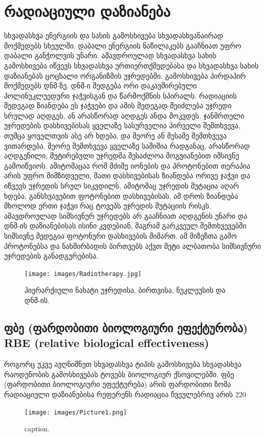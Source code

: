 \documentclass[12pt,a4paper,]{report}
\begin{document}
\chapter{რადიაციული დაზიანება}
სხვადასხვა ენერგიის და სახის გამოსხივება სხვადასხვანაირად მოქმედებს სხეულში. დაბალი ენერგიის ნაწილაკებს გააჩნიათ უფრო დაბალი განჭოლვის უნარი. ამავდროულად სხვადასხვა სახის გამოსხივება იწვევს სხვადასხვა ურთიერთქმედებასა და  სხვადასხვა სახის დაზიანებას ცოცხალი ორგანიზმის უჯრედებში. გამოსხივება პირდაპირ მოქმედებს დნმ-ზე. დნმ-ი შედგება ორი დაკავშირებული პოლინუკლუედური ჯაჭვისგან და წარმოქმნის სპირალს. რადიაციის შედეგად ზიანდება ეს ჯაჭვები და ამის შედეგად შეიძლება უჯრედი სრულად აღდგეს, ან არასწორად აღდგეს ანდა მოკვდეს. ჯანმრთელი უჯრედების დასხივებისას ყველაზე სასურველია პირველი შემთხვევა, თუმცა ყოველთვის ასე არ ხდება, და მეორე ან მესამე შემთხვევა ვითარდება. მეორე შემთხვევა ყველაზე საშიშია რადგანაც, არასწორად აღდგენილი, მუტირებული უჯრედმა შესაძლოა მოგვიანებით იმსივნე გამოიწვიოს. ამიტომაცაა რომ მძიმე იონების და პროტონებით თერაპია არის უფრო მიმზიდველი, მათი დასხივებისას ზიანდება ორივე ჯაჭვი და იწვევს უჯრედის სრულ სიკვდილს, ამიტომაც უჯრედის მუტაცია აღარ ხდება, განსხვავებით ფოტონებით დასხივებისას, ამ დროს ზიანდება მხოლოდ ერთი ჯაჭვი რაც ტოვებს უჯრედის მუტაციის რისკს. ამავდროულად სიმსივნურ უჯრედებს არ გააჩნიათ აღდგენის უნარი და დნმ-ის დაზიანებისას ისინი კვდებიან, მაგრამ გარკვეულ შემთხვევებში სიმსივნე მედეგია ფოტონური დასხივების მიმართ. ამ მიზეზთა გამო პროტონებსა და ნახშირბადის ბირთვებს აქვთ მეტი ალბათობა სიმსივნური უჯრედების განადგურებისა.

	\begin{figure}[htp]
	    \centering
        \texttt{[image: images/Radiotherapy.jpg]}
        \caption{ჰიერარქიული ნახატი უჯრედისა, ბირთვისა, ნუკლეუსის და დნმ-ის.}
        \label{fig:1}
    \end{figure}

\section{ფბე (ფარდობითი ბიოლოგიური ეფექტურობა) RBE (relative biological effectiveness)} 
როგორც უკვე ავღნიშნეთ სხვადასხვა ტიპის გამოსხივება სხვადასხვა რაოდენობის გამოსხივებას ტოვებს ბიოლოგიურ ქსოვილებში. ფბე (ფარდობითი ბიოლოგიური ეფექტურება) არის ფარდობითი ზომა რადიაციული დაზიანებისა
რეფერენს რადიაცია ჩვეულებრივ არის 220 
	\begin{figure}[htp]
	    \centering
        \texttt{[image: images/Picture1.png]}
        \caption{caption.}
        \label{fig:1}
    \end{figure}
    
\end{document}

